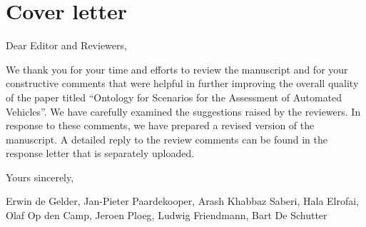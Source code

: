\documentclass[10pt,final,a4paper,oneside,onecolumn]{article}
\begin{document}
	
\section*{Cover letter}

Dear Editor and Reviewers,

We thank you for your time and efforts to review the manuscript and for your constructive comments that were helpful in further improving the overall quality of the paper titled ``Ontology for Scenarios for the Assessment of Automated Vehicles''. We have carefully examined the suggestions raised by the reviewers. In response to these comments, we have prepared a revised version of the manuscript. A detailed reply to the review comments can be found in the response letter that is separately uploaded. 

Yours sincerely,

Erwin de Gelder, Jan-Pieter Paardekooper, Arash Khabbaz Saberi, Hala Elrofai, Olaf Op den Camp, Jeroen Ploeg, Ludwig Friendmann, Bart De Schutter
\end{document}
